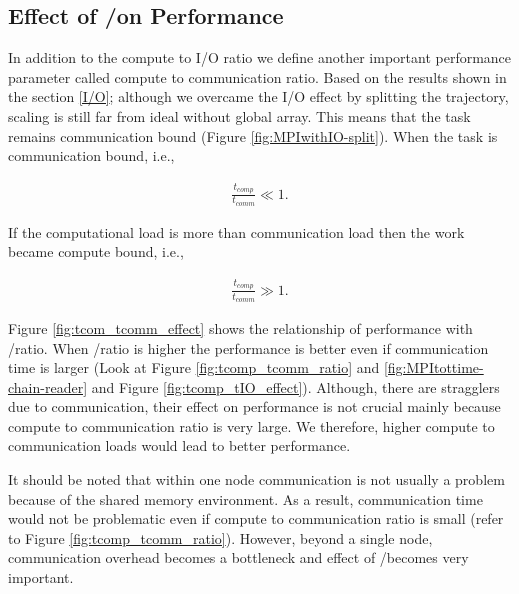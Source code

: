 \subsection{Effect of \tcomp/\tcomm on Performance}
In addition to the compute to I/O ratio we define another important performance parameter called compute to communication ratio.
Based on the results shown in the section \ref{I/O}; although we overcame the I/O effect by splitting the trajectory, scaling is still far from ideal without global array.
This means that the task remains communication bound (Figure \ref{fig:MPIwithIO-split}). 
When the task is communication bound, i.e.,

\begin{gather*}
  \frac{t_{comp}}{t_{comm}} \ll 1.
\end{gather*}

If the computational load is more than communication load then the work became compute bound, i.e.,

\begin{gather*}
  \frac{t_{comp}}{t_{comm}} \gg 1.
\end{gather*}

Figure \ref{fig:tcom_tcomm_effect} shows the relationship of performance with \tcomp/\tcomm ratio.
When \tcomp/\tcomm ratio is higher the performance is better even if communication time is larger (Look at Figure \ref{fig:tcomp_tcomm_ratio} and \ref{fig:MPItottime-chain-reader} and Figure \ref{fig:tcomp_tIO_effect}).
Although, there are stragglers due to communication, their effect on performance is not crucial mainly because compute to communication ratio is very large. 
We therefore, higher compute to communication loads would lead to better performance. 

It should be noted that within one node communication is not usually a problem because of the shared memory environment. 
As a result, communication time would not be problematic even if compute to communication ratio is small (refer to Figure \ref{fig:tcomp_tcomm_ratio}).
However, beyond a single node, communication overhead becomes a bottleneck and effect of \tcomp/\tcomm becomes very important.

